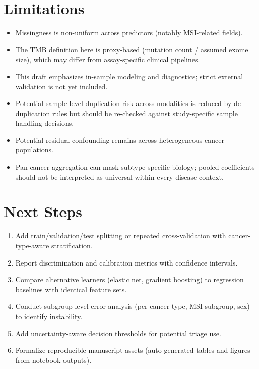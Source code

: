 \documentclass[11pt]{article}
\begin{document}
\section{Limitations}
\begin{itemize}
    \item Missingness is non-uniform across predictors (notably MSI-related fields).
    \item The TMB definition here is proxy-based (mutation count / assumed exome size), which may differ from assay-specific clinical pipelines.
    \item This draft emphasizes in-sample modeling and diagnostics; strict external validation is not yet included.
    \item Potential sample-level duplication risk across modalities is reduced by de-duplication rules but should be re-checked against study-specific sample handling decisions.
    \item Potential residual confounding remains across heterogeneous cancer populations.
    \item Pan-cancer aggregation can mask subtype-specific biology; pooled coefficients should not be interpreted as universal within every disease context.
\end{itemize}

\section{Next Steps}
\begin{enumerate}
    \item Add train/validation/test splitting or repeated cross-validation with cancer-type-aware stratification.
    \item Report discrimination and calibration metrics with confidence intervals.
    \item Compare alternative learners (elastic net, gradient boosting) to regression baselines with identical feature sets.
    \item Conduct subgroup-level error analysis (per cancer type, MSI subgroup, sex) to identify instability.
    \item Add uncertainty-aware decision thresholds for potential triage use.
    \item Formalize reproducible manuscript assets (auto-generated tables and figures from notebook outputs).
\end{enumerate}
\end{document}
